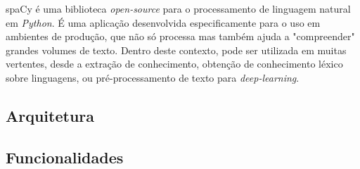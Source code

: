 \documentclass[12pt]{article}
\begin{document}
spaCy é uma biblioteca \textit{open-source} para o processamento de linguagem natural em \textit{Python}. É uma aplicação desenvolvida especificamente para o uso em ambientes de 
produção, que não só processa mas também ajuda a "compreender" grandes volumes de texto. Dentro deste contexto, pode ser utilizada em muitas vertentes, desde a extração de
conhecimento, obtenção de conhecimento léxico sobre linguagens, ou pré-processamento de texto para \textit{deep-learning}.


\subsection{Arquitetura} %


\subsection{Funcionalidades}
\end{document}
